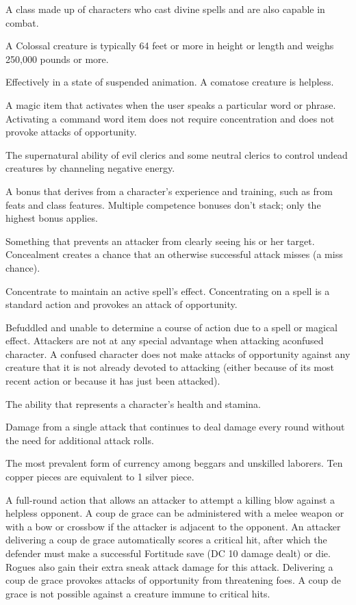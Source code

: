  A class made up of characters who cast divine spells 
and are also capable in combat. 

 A Colossal creature is typically 64 feet or more in 
height or length and weighs 250,000 pounds or more. 

 Effectively in a state of suspended animation. A 
comatose creature is helpless. 

 A magic item that activates when the user 
speaks a particular word or phrase. Activating a command word item 
does not require concentration and does not provoke attacks of 
opportunity. 

 The supernatural ability of evil clerics and 
some neutral clerics to control undead creatures by channeling 
negative energy. 

 A bonus that derives from a character's experience and training, such as from feats and class features.  Multiple competence bonuses don't stack; only the highest bonus applies. 

 Something that prevents an attacker from clearly 
seeing his or her target. Concealment creates a chance that an 
otherwise successful attack misses (a miss chance). 

 Concentrate to maintain an active spell's 
effect. Concentrating on a spell is a standard action and provokes an 
attack of opportunity. 

 Befuddled and unable to determine a course of action due 
to a spell or magical effect. \confusionexplanation Attackers are not at any special advantage when attacking aconfused
character. A confused character does not make attacks of 
opportunity against any creature that it is not already devoted to 
attacking (either because of its most recent action or because it has 
just been attacked).

 The ability that represents a character's 
health and stamina. 

 Damage from a single attack that continues 
to deal damage every round without the need for additional attack 
rolls. 

 The most prevalent form of currency among 
beggars and unskilled laborers. Ten copper pieces are equivalent to 1 silver 
piece. 

 A full-round action that allows an attacker to 
attempt a killing blow against a helpless opponent. A coup de grace 
can be administered with a melee weapon or with a bow or crossbow 
if the attacker is adjacent to the opponent. An attacker delivering a 
coup de grace automatically scores a critical hit, after which the 
defender must make a successful Fortitude save (DC 10 \add damage 
dealt) or die. Rogues also gain their extra sneak attack damage for 
this attack. Delivering a coup de grace provokes attacks of opportunity from threatening foes. A coup de grace is not possible against 
a creature immune to critical hits. 

